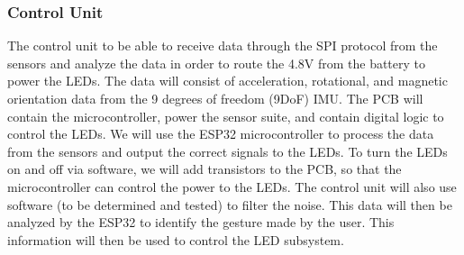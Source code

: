 \documentclass[12pt]{article}
\begin{document}
    \subsubsection{Control Unit} 
    The control unit to be able to receive data through the SPI protocol from the sensors and analyze the data in order to route the 4.8V from the battery to power the LEDs. The data will consist of acceleration, rotational, and magnetic orientation data from the 9 degrees of freedom (9DoF) IMU. The PCB will contain the microcontroller, power the sensor suite, and contain digital logic to control the LEDs. We will use the 
    ESP32 microcontroller \cite{EspressifESP32} to process the data from the sensors 
    and output the correct signals to the LEDs. To turn the LEDs on and off via software, we will add transistors \cite{MicrochipVN10K} to the PCB, so that the microcontroller can control the power to the LEDs. The control unit will also use software (to be determined and tested) to filter the noise. This data will then be analyzed by the ESP32 to identify the gesture made by the user. This information will then be used to control the LED subsystem.
\end{document}
